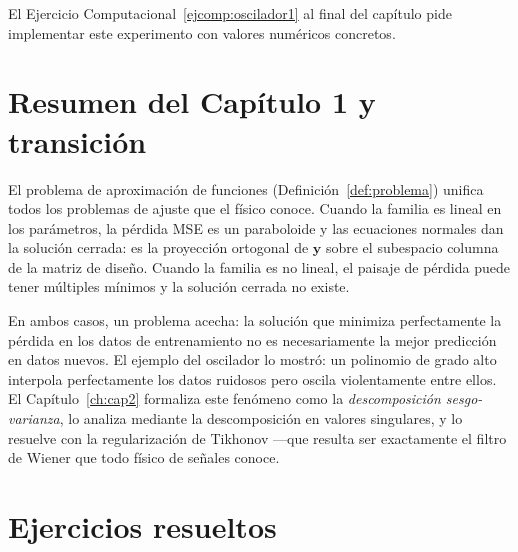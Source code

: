 El Ejercicio Computacional~\ref{ejcomp:oscilador1} al final del
capítulo pide implementar este experimento con valores numéricos
concretos.

\section{Resumen del Capítulo 1 y transición}
\label{sec:resumen1}

El problema de aproximación de funciones
(Definición~\ref{def:problema}) unifica todos los problemas de ajuste
que el físico conoce. Cuando la familia es lineal en los parámetros, la
pérdida MSE es un paraboloide y las ecuaciones normales dan la solución
cerrada: es la proyección ortogonal de $\bm{y}$ sobre el subespacio
columna de la matriz de diseño. Cuando la familia es no lineal, el
paisaje de pérdida puede tener múltiples mínimos y la solución cerrada
no existe.

En ambos casos, un problema acecha: la solución que minimiza
perfectamente la pérdida en los datos de entrenamiento no es
necesariamente la mejor predicción en datos nuevos. El ejemplo del
oscilador lo mostró: un polinomio de grado alto interpola perfectamente
los datos ruidosos pero oscila violentamente entre ellos. El
Capítulo~\ref{ch:cap2} formaliza este fenómeno como la
\emph{descomposición sesgo-varianza}, lo analiza mediante la
descomposición en valores singulares, y lo resuelve con la
regularización de Tikhonov —que resulta ser exactamente el filtro de
Wiener que todo físico de señales conoce.

\section*{Ejercicios resueltos}

